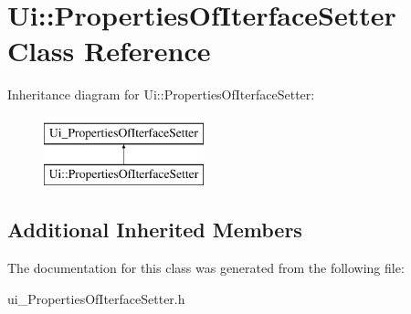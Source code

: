 \hypertarget{class_ui_1_1_properties_of_iterface_setter}{\section{Ui\-:\-:Properties\-Of\-Iterface\-Setter Class Reference}
\label{class_ui_1_1_properties_of_iterface_setter}
}
Inheritance diagram for Ui\-:\-:Properties\-Of\-Iterface\-Setter\-:\begin{figure}[H]
\begin{center}
\leavevmode
\includegraphics[height=2.000000cm]{class_ui_1_1_properties_of_iterface_setter}
\end{center}
\end{figure}
\subsection*{Additional Inherited Members}


The documentation for this class was generated from the following file\-:\begin{DoxyCompactItemize}
\item 
ui\-\_\-\-Properties\-Of\-Iterface\-Setter.\-h\end{DoxyCompactItemize}
